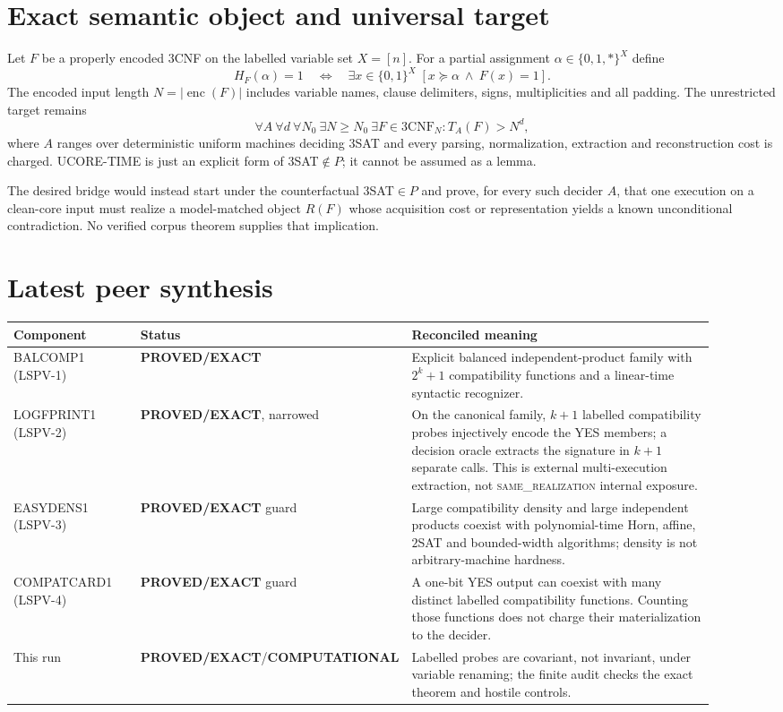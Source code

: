 \documentclass[11pt]{article}
\newcommand{\EXACT}{\textbf{PROVED/EXACT}}
\newcommand{\COMP}{\textbf{COMPUTATIONAL}}
\newcommand{\same}{\textsc{same\_realization}}
\begin{document}
\section{Exact semantic object and universal target}

Let $F$ be a properly encoded $3$CNF on the labelled variable set
$X=[n]$.  For a partial assignment $\alpha\in\{0,1,*\}^{X}$ define
\[
 H_F(\alpha)=1\quad\Longleftrightarrow\quad
 \exists x\in\{0,1\}^{X}\;[x\succeq\alpha\ \wedge\ F(x)=1].
\]
The encoded input length $N=|\operatorname{enc}(F)|$ includes variable names, clause
delimiters, signs, multiplicities and all padding.  The unrestricted target remains
\[
\tag{UCORE-TIME}
\forall A\ \forall d\ \forall N_0\ \exists N\ge N_0\ \exists F\in 3\mathrm{CNF}_N:
 T_A(F)>N^d,
\]
where $A$ ranges over deterministic uniform machines deciding $3$SAT and every parsing,
normalization, extraction and reconstruction cost is charged.  UCORE-TIME is just an
explicit form of $3$SAT$\notin P$; it cannot be assumed as a lemma.

The desired bridge would instead start under the counterfactual $3$SAT$\in P$ and prove,
for every such decider $A$, that one execution on a clean-core input must realize a
model-matched object $R(F)$ whose acquisition cost or representation yields a known
unconditional contradiction.  No verified corpus theorem supplies that implication.

\section{Latest peer synthesis}

\begin{center}
\begin{tabular}{p{0.19\linewidth}p{0.18\linewidth}p{0.54\linewidth}}
\toprule
Component & Status & Reconciled meaning\\
\midrule
BALCOMP1 (LSPV-1) & \EXACT & Explicit balanced independent-product family with
$2^k+1$ compatibility functions and a linear-time syntactic recognizer.\\
LOGFPRINT1 (LSPV-2) & \EXACT, narrowed & On the canonical family, $k+1$ labelled
compatibility probes injectively encode the YES members; a decision oracle extracts the
signature in $k+1$ separate calls.  This is external multi-execution extraction, not
\same{} internal exposure.\\
EASYDENS1 (LSPV-3) & \EXACT{} guard & Large compatibility density and large
independent products coexist with polynomial-time Horn, affine, $2$SAT and bounded-width
algorithms; density is not arbitrary-machine hardness.\\
COMPATCARD1 (LSPV-4) & \EXACT{} guard & A one-bit YES output can coexist with many
distinct labelled compatibility functions.  Counting those functions does not charge
their materialization to the decider.\\
This run & \EXACT/\COMP & Labelled probes are covariant, not invariant, under variable
renaming; the finite audit checks the exact theorem and hostile controls.\\
\bottomrule
\end{tabular}
\end{center}
\end{document}
